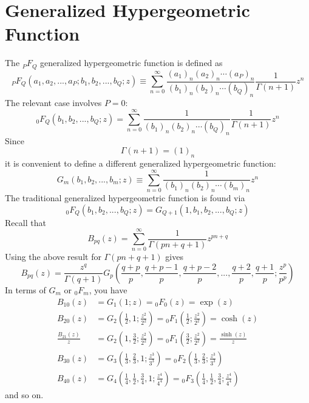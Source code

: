 \section{Generalized Hypergeometric Function}
The ${}_{P}F_{Q}$ generalized hypergeometric function is defined as
\begin{equation}
    {}_{P}F_{Q}(a_{1}, a_{2}, ..., a_{P}; b_{1}, b_{2}, ..., b_{Q}; z) \equiv \sum_{n=0}^{\infty} \frac{(a_{1})_{n} (a_{2})_{n} \cdots (a_{P})_{n}}{(b_{1})_{n} (b_{2})_{n} \cdots (b_{Q})_{n}} \frac{1}{\Gamma(n+1)} z^{n}
\end{equation}
The relevant case involves $P = 0$:
\begin{equation}
    {}_{0}F_{Q}(b_{1}, b_{2}, ..., b_{Q}; z) = \sum_{n=0}^{\infty} \frac{1}{(b_{1})_{n} (b_{2})_{n} \cdots (b_{Q})_{n}} \frac{1}{\Gamma(n+1)} z^{n}
\end{equation}
Since
\begin{equation}
    \Gamma(n+1) = (1)_{n}
\end{equation}
it is convenient to define a different generalized hypergeometric function:
\begin{equation}
    G_{m}(b_{1}, b_{2}, ..., b_{m}; z) \equiv \sum_{n=0}^{\infty} \frac{1}{(b_{1})_{n} (b_{2})_{n} \cdots (b_{m})_{n}} z^{n}
\end{equation}
The traditional generalized hypergeometric function is found via
\begin{equation}
    {}_{0}F_{Q}(b_{1}, b_{2}, ..., b_{Q}; z) = G_{Q+1}(1, b_{1}, b_{2}, ..., b_{Q}; z)
\end{equation}
Recall that
\begin{equation}
    B_{pq}(z) = \sum_{n=0}^{\infty} \frac{1}{\Gamma(pn+q+1)} z^{pn+q}
\end{equation}
Using the above result for $\Gamma(pn+q+1)$ gives
\begin{equation}
    B_{pq}(z) = \frac{z^{q}}{\Gamma(q+1)} G_{p}\left(\frac{q + p}{p}, \frac{q + p-1}{p}, \frac{q + p-2}{p}, ..., \frac{q + 2}{p}, \frac{q+1}{p}; \frac{z^{p}}{p^{p}}\right)
\end{equation}
In terms of $G_{m}$ or ${}_{0}F_{m}$, you have
\begin{align}
    B_{10}(z) &= G_{1}(1; z) = {}_{0} F_{0}(z) = \exp(z) \\
    B_{20}(z) &= G_{2}\left(\frac{1}{2}, 1; \frac{z^{2}}{2^{2}}\right) = {}_{0} F_{1}\left(\frac{1}{2}; \frac{z^{2}}{2^{2}}\right) = \cosh(z) \\
    \frac{B_{21}(z)}{z} &= G_{2}\left(1, \frac{3}{2}; \frac{z^{2}}{2^{2}}\right) = {}_{0} F_{1}\left(\frac{3}{2}; \frac{z^{2}}{2^{2}}\right) = \frac{\sinh(z)}{z} \\
    B_{30}(z) &= G_{3}\left(\frac{1}{3}, \frac{2}{3}, 1; \frac{z^{3}}{3^{3}}\right) = {}_{0}F_{2}\left(\frac{1}{3}, \frac{2}{3}; \frac{z^{3}}{3^{3}}\right) \\
    B_{40}(z) &= G_{4}\left(\frac{1}{4}, \frac{1}{2}, \frac{3}{4}, 1; \frac{z^{4}}{4^{4}}\right) = {}_{0}F_{3}\left(\frac{1}{4}, \frac{1}{2}, \frac{3}{4}; \frac{z^{4}}{4^{4}}\right)
\end{align}
and so on.